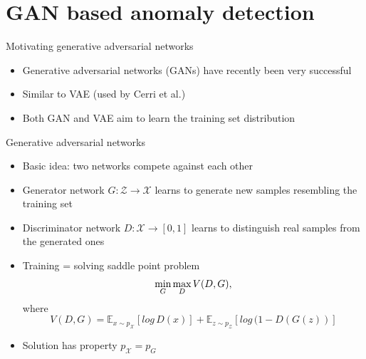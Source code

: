 \documentclass{beamer}
\begin{document}
\section{GAN based anomaly detection}

\begin{frame}{Motivating generative adversarial networks}
  \begin{itemize}
      \item<1-> Generative adversarial networks (GANs) have recently been very successful
      \item<2-> Similar to VAE (used by Cerri et al.)
      \item<3-> Both GAN and VAE aim to learn the training set distribution
  \end{itemize}
\end{frame}

\begin{frame}{Generative adversarial networks}
  \begin{itemize}
      \item<1-> Basic idea: two networks compete against each other
      \item<2-> Generator network $G: \mathcal{Z} \rightarrow \mathcal{X}$ learns to generate new samples resembling the training set
      \item<3-> Discriminator network $D:\mathcal{X} \rightarrow [0,1]$ learns to distinguish real samples from the generated ones
      \item<4-> Training = solving saddle point problem
      \begin{equation}
      \underset{G}{\textup{min}}\, \underset{D}{\textup{max}}\, V(D,G),
      \end{equation}
      where
      \begin{equation}
        V(D,G)=\mathbb{E}_{x\sim p_\mathcal{X}}[log\,D(x)] + \mathbb{E}_{z\sim p_\mathcal{Z}}[log\,(1-D(G(z))]
      \end{equation}
      
      \item<5-> Solution has property $p_\mathcal{X}=p_G$
  \end{itemize}
\end{frame}
\end{document}
